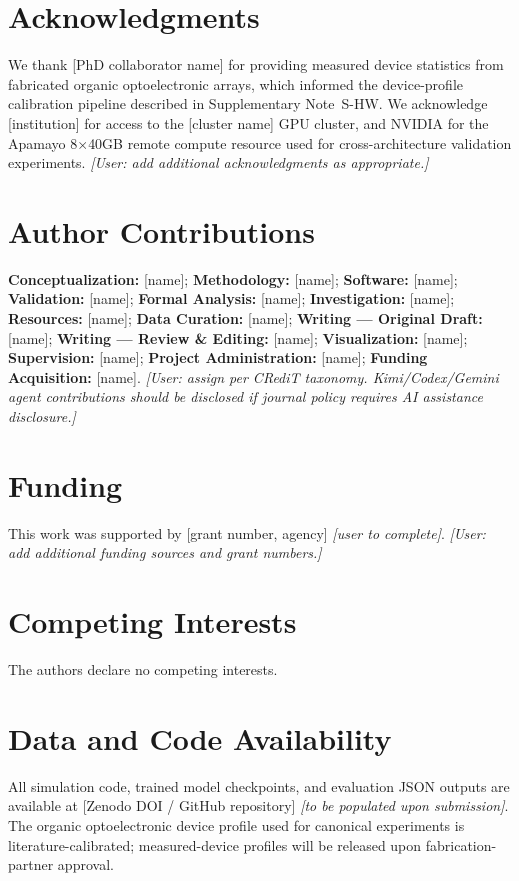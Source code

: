 
\section*{Acknowledgments}

We thank [PhD collaborator name] for providing measured device statistics from fabricated organic optoelectronic arrays, which informed the device-profile calibration pipeline described in Supplementary Note~S-HW.
We acknowledge [institution] for access to the [cluster name] GPU cluster, and NVIDIA for the Apamayo 8$\times$40GB remote compute resource used for cross-architecture validation experiments.
\textit{[User: add additional acknowledgments as appropriate.]}

\section*{Author Contributions}

\textbf{Conceptualization:} [name]; \textbf{Methodology:} [name]; \textbf{Software:} [name]; \textbf{Validation:} [name]; \textbf{Formal Analysis:} [name]; \textbf{Investigation:} [name]; \textbf{Resources:} [name]; \textbf{Data Curation:} [name]; \textbf{Writing --- Original Draft:} [name]; \textbf{Writing --- Review \& Editing:} [name]; \textbf{Visualization:} [name]; \textbf{Supervision:} [name]; \textbf{Project Administration:} [name]; \textbf{Funding Acquisition:} [name].
\textit{[User: assign per CRediT taxonomy. Kimi/Codex/Gemini agent contributions should be disclosed if journal policy requires AI assistance disclosure.]}

\section*{Funding}

This work was supported by [grant number, agency] \textit{[user to complete]}.
\textit{[User: add additional funding sources and grant numbers.]}

\section*{Competing Interests}

The authors declare no competing interests.

\section*{Data and Code Availability}

All simulation code, trained model checkpoints, and evaluation JSON outputs are available at [Zenodo DOI / GitHub repository] \textit{[to be populated upon submission]}.
The organic optoelectronic device profile used for canonical experiments is literature-calibrated; measured-device profiles will be released upon fabrication-partner approval.

